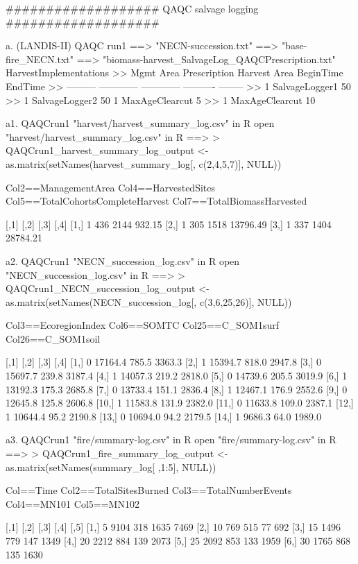 ###################
QAQC salvage logging
###################


	a. (LANDIS-II) QAQC run1 
		==> "NECN-succession.txt"
		==> "base-fire_NECN.txt"
		==> "biomass-harvest_SalvageLog_QAQCPrescription.txt"
    HarvestImplementations
>>	Mgmt Area	Prescription	Harvest Area	BeginTime	EndTime
>>	---------	------------	------------	----------	--------
>>	1		SalvageLogger1		50%
>>	1		SalvageLogger2		50%
	1		MaxAgeClearcut		5%
>>	1		MaxAgeClearcut		10%



	a1. QAQCrun1 "harvest/harvest_summary_log.csv" in R
open "harvest/harvest_summary_log.csv" in R ==>
> QAQCrun1_harvest_summary_log_output <- as.matrix(setNames(harvest_summary_log[, c(2,4,5,7)], NULL))

Col2==ManagementArea
Col4==HarvestedSites
Col5==TotalCohortsCompleteHarvest
Col7==TotalBiomassHarvested

     [,1] [,2] [,3]     [,4]
[1,]    1  436 2144   932.15
[2,]    1  305 1518 13796.49
[3,]    1  337 1404 28784.21


	a2. QAQCrun1 "NECN_succession_log.csv" in R
open "NECN_succession_log.csv" in R ==>
> QAQCrun1_NECN_succession_log_output <- as.matrix(setNames(NECN_succession_log[, c(3,6,25,26)], NULL))

Col3==EcoregionIndex
Col6==SOMTC
Col25==C_SOM1surf
Col26==C_SOM1soil

      [,1]    [,2]  [,3]   [,4]
 [1,]    0 17164.4 785.5 3363.3
 [2,]    1 15394.7 818.0 2947.8
 [3,]    0 15697.7 239.8 3187.4
 [4,]    1 14057.3 219.2 2818.0
 [5,]    0 14739.6 205.5 3019.9
 [6,]    1 13192.3 175.3 2685.8
 [7,]    0 13733.4 151.1 2836.4
 [8,]    1 12467.1 176.9 2552.6
 [9,]    0 12645.8 125.8 2606.8
[10,]    1 11583.8 131.9 2382.0
[11,]    0 11633.8 109.0 2387.1
[12,]    1 10644.4  95.2 2190.8
[13,]    0 10694.0  94.2 2179.5
[14,]    1  9686.3  64.0 1989.0


	a3. QAQCrun1 "fire/summary-log.csv" in R
open "fire/summary-log.csv" in R ==>
> QAQCrun1_fire_summary_log_output <- as.matrix(setNames(summary_log[ ,1:5], NULL))

Col==Time
Col2==TotalSitesBurned
Col3==TotalNumberEvents
Col4==MN101
Col5==MN102

     [,1] [,2] [,3] [,4] [,5]
[1,]    5 9104  318 1635 7469
[2,]   10  769  515   77  692
[3,]   15 1496  779  147 1349
[4,]   20 2212  884  139 2073
[5,]   25 2092  853  133 1959
[6,]   30 1765  868  135 1630







